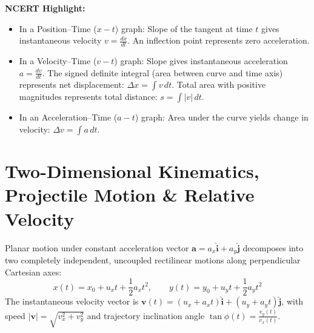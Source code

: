 \documentclass[10pt,a4paper]{article}
\begin{document}
\begin{ncertbox}
\textbf{NCERT Highlight:}
\begin{itemize}
  \item In a Position--Time ($x-t$) graph: Slope of the tangent at time $t$ gives instantaneous velocity $v = \frac{dx}{dt}$. An inflection point represents zero acceleration.
  \item In a Velocity--Time ($v-t$) graph: Slope gives instantaneous acceleration $a = \frac{dv}{dt}$. The signed definite integral (area between curve and time axis) represents net displacement: $\Delta x = \int v\,dt$. Total area with positive magnitudes represents total distance: $s = \int |v|\,dt$.
  \item In an Acceleration--Time ($a-t$) graph: Area under the curve yields change in velocity: $\Delta v = \int a\,dt$.
\end{itemize}
\end{ncertbox}

\section{Two-Dimensional Kinematics, Projectile Motion \& Relative Velocity}

\begin{conceptbox}
Planar motion under constant acceleration vector $\mathbf{a} = a_x \hat{\mathbf{i}} + a_y \hat{\mathbf{j}}$ decomposes into two completely independent, uncoupled rectilinear motions along perpendicular Cartesian axes:
\begin{equation}
  x(t) = x_0 + u_x t + \frac{1}{2}a_x t^2, \qquad y(t) = y_0 + u_y t + \frac{1}{2}a_y t^2
\end{equation}
The instantaneous velocity vector is $\mathbf{v}(t) = (u_x + a_x t)\hat{\mathbf{i}} + (u_y + a_y t)\hat{\mathbf{j}}$, with speed $|\mathbf{v}| = \sqrt{v_x^2 + v_y^2}$ and trajectory inclination angle $\tan\phi(t) = \frac{v_y(t)}{v_x(t)}$.
\end{conceptbox}
\end{document}
